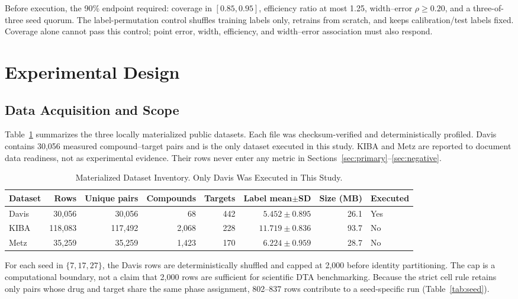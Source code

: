 \documentclass[lettersize,journal]{IEEEtran}
\begin{document}
Before execution, the 90\% endpoint required: coverage in $[0.85,0.95]$, efficiency ratio at most 1.25, width--error $\rho\ge0.20$, and a three-of-three seed quorum. The label-permutation control shuffles training labels only, retrains from scratch, and keeps calibration/test labels fixed. Coverage alone cannot pass this control; point error, width, efficiency, and width--error association must also respond.

\section{Experimental Design}

\subsection{Data Acquisition and Scope}
Table~\ref{tab:datasets} summarizes the three locally materialized public datasets. Each file was checksum-verified and deterministically profiled. Davis contains 30,056 measured compound--target pairs and is the only dataset executed in this study. KIBA and Metz are reported to document data readiness, not as experimental evidence. Their rows never enter any metric in Sections~\ref{sec:primary}--\ref{sec:negative}.

\begin{table}[!t]
\caption{Materialized Dataset Inventory. Only Davis Was Executed in This Study.}
\label{tab:datasets}
\centering
\begin{tabular}{lrrrrrrl}
\toprule
Dataset & Rows & Unique pairs & Compounds & Targets & Label mean$\pm$SD & Size (MB) & Executed \\
\midrule
Davis \cite{davis2011} & 30,056 & 30,056 & 68 & 442 & $5.452\pm0.895$ & 26.1 & Yes \\
KIBA \cite{tang2014kiba} & 118,083 & 117,492 & 2,068 & 228 & $11.719\pm0.836$ & 93.7 & No \\
Metz \cite{metz2011} & 35,259 & 35,259 & 1,423 & 170 & $6.224\pm0.959$ & 28.7 & No \\
\bottomrule
\end{tabular}
\end{table}

For each seed in $\{7,17,27\}$, the Davis rows are deterministically shuffled and capped at 2,000 before identity partitioning. The cap is a computational boundary, not a claim that 2,000 rows are sufficient for scientific DTA benchmarking. Because the strict cell rule retains only pairs whose drug and target share the same phase assignment, 802--837 rows contribute to a seed-specific run (Table~\ref{tab:seed}).
\end{document}
